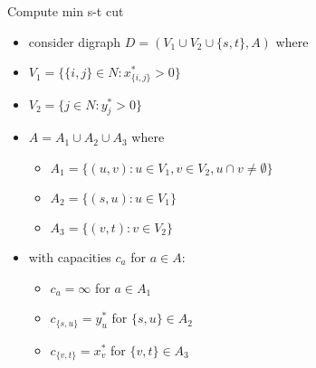 \documentclass{beamer}
\begin{document}
\begin{frame}{Compute min s-t cut}
  \begin{itemize}
  \item consider digraph $D = (V_1 \cup V_2 \cup \{s,t\}, A)$ where
  \item $V_1 = \{\{i,j\} \in N: x^*_{\{i,j\}} > 0\}$
  \item $V_2 = \{j \in N: y^*_j > 0\}$
  \item $A = A_1 \cup A_2 \cup A_3$ where
    \begin{itemize}
      \item $A_1 = \{(u,v) : u \in V_1, v \in V_2, u \cap v \neq
        \emptyset\}$
      \item $A_2 = \{(s,u) : u \in V_1\}$
      \item $A_3 = \{(v,t) : v \in V_2\}$
    \end{itemize}
  \item with capacities $c_a$ for $a \in A$:
    \begin{itemize}
    \item $c_a = \infty$ for $a \in A_1$
    \item $c_{\{s,u\}} = y^*_u$ for $\{s,u\} \in A_2$
    \item $c_{\{v,t\}} = x^*_v$ for $\{v,t\} \in A_3$
    \end{itemize}
  \end{itemize}
\end{frame}
\end{document}
